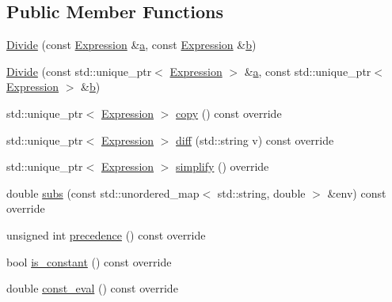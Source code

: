 \subsection*{Public Member Functions}
\begin{DoxyCompactItemize}
\item 
\mbox{\hyperlink{classsymcpp_1_1Divide_a1399cc15ca3af6ed217c20cadb2694ad}{Divide}} (const \mbox{\hyperlink{classsymcpp_1_1Expression}{Expression}} \&\mbox{\hyperlink{classsymcpp_1_1Divide_a52eaf8a705da4ef10b1fa2b87e76d0d8}{a}}, const \mbox{\hyperlink{classsymcpp_1_1Expression}{Expression}} \&\mbox{\hyperlink{classsymcpp_1_1Divide_a122c034c19635c036d39fbf18b1b8348}{b}})
\item 
\mbox{\hyperlink{classsymcpp_1_1Divide_a010b104132d0341805ca34277422d867}{Divide}} (const std\+::unique\+\_\+ptr$<$ \mbox{\hyperlink{classsymcpp_1_1Expression}{Expression}} $>$ \&\mbox{\hyperlink{classsymcpp_1_1Divide_a52eaf8a705da4ef10b1fa2b87e76d0d8}{a}}, const std\+::unique\+\_\+ptr$<$ \mbox{\hyperlink{classsymcpp_1_1Expression}{Expression}} $>$ \&\mbox{\hyperlink{classsymcpp_1_1Divide_a122c034c19635c036d39fbf18b1b8348}{b}})
\item 
std\+::unique\+\_\+ptr$<$ \mbox{\hyperlink{classsymcpp_1_1Expression}{Expression}} $>$ \mbox{\hyperlink{classsymcpp_1_1Divide_a6e4eeef806e8bded246e87d0036effee}{copy}} () const override
\item 
std\+::unique\+\_\+ptr$<$ \mbox{\hyperlink{classsymcpp_1_1Expression}{Expression}} $>$ \mbox{\hyperlink{classsymcpp_1_1Divide_aeecc60e1759b81ea65b0b95a62ff38df}{diff}} (std\+::string v) const override
\item 
std\+::unique\+\_\+ptr$<$ \mbox{\hyperlink{classsymcpp_1_1Expression}{Expression}} $>$ \mbox{\hyperlink{classsymcpp_1_1Divide_ab0e372a337f207a3e4c78fd1db9351a7}{simplify}} () override
\item 
double \mbox{\hyperlink{classsymcpp_1_1Divide_a85dcd571e1d2a188dcdc8090b7e90074}{subs}} (const std\+::unordered\+\_\+map$<$ std\+::string, double $>$ \&env) const override
\item 
unsigned int \mbox{\hyperlink{classsymcpp_1_1Divide_a016fec0e409cff8d0cd2b53eea1fa6c3}{precedence}} () const override
\item 
bool \mbox{\hyperlink{classsymcpp_1_1Divide_a342ddc6fb6f80a37797bda030b4c7580}{is\+\_\+constant}} () const override
\item 
double \mbox{\hyperlink{classsymcpp_1_1Divide_a18ab0e9eddd473ee5400607b9e6ea2b0}{const\+\_\+eval}} () const override
\end{DoxyCompactItemize}
